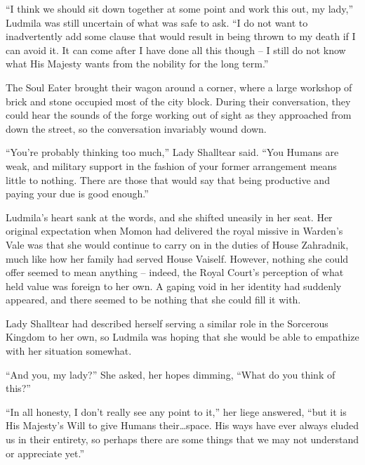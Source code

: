  

“I think we should sit down together at some point and work this out, my lady,” Ludmila was still uncertain of what was safe to ask. “I do not want to inadvertently add some clause that would result in being thrown to my death if I can avoid it. It can come after I have done all this though – I still do not know what His Majesty wants from the nobility for the long term.”

 

The Soul Eater brought their wagon around a corner, where a large workshop of brick and stone occupied most of the city block. During their conversation, they could hear the sounds of the forge working out of sight as they approached from down the street, so the conversation invariably wound down.

 

“You’re probably thinking too much,” Lady Shalltear said. “You Humans are weak, and military support in the fashion of your former arrangement means little to nothing. There are those that would say that being productive and paying your due is good enough.”

 

Ludmila’s heart sank at the words, and she shifted uneasily in her seat. Her original expectation when Momon had delivered the royal missive in Warden’s Vale was that she would continue to carry on in the duties of House Zahradnik, much like how her family had served House Vaiself. However, nothing she could offer seemed to mean anything – indeed, the Royal Court’s perception of what held value was foreign to her own. A gaping void in her identity had suddenly appeared, and there seemed to be nothing that she could fill it with.

 

Lady Shalltear had described herself serving a similar role in the Sorcerous Kingdom to her own, so Ludmila was hoping that she would be able to empathize with her situation somewhat.

 

“And you, my lady?” She asked, her hopes dimming, “What do you think of this?”

 

“In all honesty, I don’t really see any point to it,” her liege answered, “but it is His Majesty’s Will to give Humans their…space. His ways have ever always eluded us in their entirety, so perhaps there are some things that we may not understand or appreciate yet.”